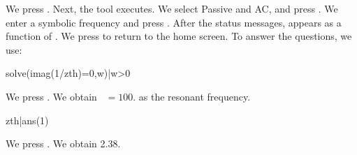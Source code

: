 We press . Next, the tool executes. We select Passive and
AC, and press . We enter a symbolic frequency 
and press . After the status messages,  appears
as a function of . We press  to return to the
home screen. To answer the questions, we use:

\begin{entry}
solve(imag(1/zth)=0,w)|w>0
\end{entry}

We press . We obtain ~$= 100.$ as the resonant
frequency.

\begin{entry}
zth|ans(1)
\end{entry}

We press . We obtain 2.38.

